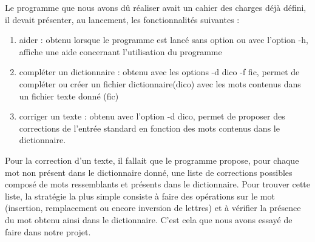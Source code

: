 Le programme que nous avons dû réaliser avait un cahier des charges déjà défini, il devait présenter, au lancement, les fonctionnalités suivantes :
\begin{enumerate}
	\item aider : obtenu lorsque le programme est lancé sans option ou avec l'option -h, affiche une aide concernant l'utilisation du programme
	\item compléter un dictionnaire : obtenu avec les options -d dico -f fic, permet de compléter ou créer un fichier dictionnaire(dico) avec les mots contenus dans un fichier texte donné (fic)
	\item corriger un texte : obtenu avec l'option -d dico, permet de proposer des corrections de l'entrée standard en fonction des mots contenus dans le dictionnaire. 
\end{enumerate}

Pour la correction d'un texte, il fallait que le programme propose, pour chaque mot non présent dans le dictionnaire donné, une liste de corrections possibles composé de mots ressemblants et présents dans le dictionnaire. Pour trouver cette liste, la stratégie la plus simple consiste  à faire des opérations sur le mot (insertion, remplacement ou encore inversion de lettres) et à vérifier la présence du mot obtenu ainsi dans le dictionnaire. C'est cela que nous avons essayé de faire dans notre projet. 